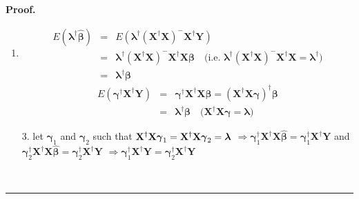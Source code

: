 \documentclass{article}
\newenvironment{proof}[1][Proof]{\noindent\textbf{#1.} }{\ \rule{0.5em}{0.5em}}
\begin{document}
\begin{proof}
\begin{enumerate}
\item 
\begin{eqnarray*}
E\left( \mathbf{\lambda }^{\dagger }\mathbf{\hat{\beta}}\right) &=&E\left( 
\mathbf{\lambda }^{\dagger }\left( \mathbf{X}^{\dagger }\mathbf{X}\right)
^{-}\mathbf{X}^{\dagger }\mathbf{Y}\right) \\
&=&\mathbf{\lambda }^{\dagger }\left( \mathbf{X}^{\dagger }\mathbf{X}\right)
^{-}\mathbf{X}^{\dagger }\mathbf{X\beta \quad }\text{(i.e. }\mathbf{\lambda }%
^{\dagger }\left( \mathbf{X}^{\dagger }\mathbf{X}\right) ^{-}\mathbf{X}%
^{\dagger }\mathbf{X=\lambda }^{\dagger }\text{)} \\
&=&\mathbf{\lambda }^{\dagger }\mathbf{\beta }
\end{eqnarray*}%
\begin{eqnarray*}
E\left( \mathbf{\gamma }^{\dagger }\mathbf{X}^{\dagger }\mathbf{Y}\right) &=&%
\mathbf{\gamma }^{\dagger }\mathbf{X}^{\dagger }\mathbf{X\beta =}\left( 
\mathbf{X}^{\dagger }\mathbf{X\gamma }\right) ^{\dagger }\mathbf{\beta } \\
&=&\mathbf{\lambda }^{\dagger }\mathbf{\beta \quad }\text{(}\mathbf{X}%
^{\dagger }\mathbf{X\gamma =\lambda }\text{)}
\end{eqnarray*}

\item[3.] let $\mathbf{\gamma }_{1}$ and $\mathbf{\gamma }_{2}$ such that $%
\mathbf{X}^{\dagger }\mathbf{X\gamma }_{1}=\mathbf{X}^{\dagger }\mathbf{%
X\gamma }_{2}=\mathbf{\lambda }$\newline
$\Rightarrow \mathbf{\gamma }_{1}^{\dagger }\mathbf{X}^{\dagger }\mathbf{X%
\hat{\beta}}=\mathbf{\gamma }_{1}^{\dagger }\mathbf{X^{\dagger }Y}$ and $%
\mathbf{\gamma }_{2}^{\dagger }\mathbf{X}^{\dagger }\mathbf{X\hat{\beta}}=%
\mathbf{\gamma }_{2}^{\dagger }\mathbf{X}^{\dagger }\mathbf{Y}$\newline
$\Rightarrow \mathbf{\gamma }_{1}^{\dagger }\mathbf{X}^{\dagger }\mathbf{Y}=%
\mathbf{\gamma }_{2}^{\dagger }\mathbf{X}^{\dagger }\mathbf{Y}$


\end{enumerate}
\end{proof}
\end{document}
